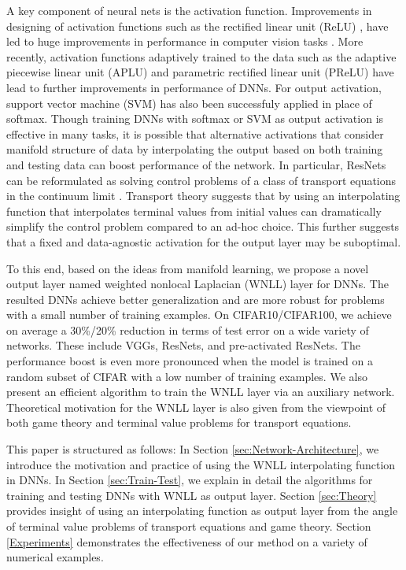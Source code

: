 \documentclass{article}
\begin{document}
A key component of neural nets is the activation function. Improvements in designing of activation functions such as the rectified linear unit (ReLU) \cite{glorot2011deep}, have led to huge improvements in performance in computer vision tasks \cite{nair2010rectified, krizhevsky2012imagenet}. More recently, activation functions adaptively trained to the data such as the adaptive piecewise linear unit (APLU) \cite{agostinelli2014learning} and parametric rectified linear unit (PReLU) \cite{he2015delving} have lead to further improvements in performance of DNNs. For output activation, support vector machine (SVM) has also been successfuly applied in place of softmax\cite{Tang:2013}. Though training DNNs with softmax or SVM as output activation is effective in many tasks, it is possible that alternative activations that consider manifold structure of data by interpolating the output based on both training and testing data can boost performance of the network. In particular, ResNets can be reformulated as solving control problems of a class of transport equations in the continuum limit \cite{ResNet:PDE, chang2017multi}. Transport theory suggests that by using an interpolating function that interpolates terminal values from initial values can dramatically simplify the control problem compared to an ad-hoc choice. This further suggests that a fixed and data-agnostic activation for the output layer may be suboptimal.

To this end, based on the ideas from manifold learning, we propose a novel output layer named weighted nonlocal Laplacian (WNLL) layer for DNNs. The resulted DNNs achieve better generalization and are more robust for problems with a small number of training examples. On CIFAR10/CIFAR100, we achieve on average a 30\%/20\% reduction in terms of test error on a wide variety of networks. These include VGGs, ResNets, and pre-activated ResNets. The performance boost is even more pronounced when the model is trained on a random subset of CIFAR with a low number of training examples. We also present an efficient algorithm to train the WNLL layer via an auxiliary network. Theoretical motivation for the WNLL layer is also given from the viewpoint of both game theory and terminal value problems for transport equations.

This paper is structured as follows: In Section \ref{sec:Network-Architecture}, we introduce the motivation and practice of using the WNLL interpolating function in DNNs. In Section \ref{sec:Train-Test}, we explain in detail the algorithms for training and testing DNNs with WNLL as output layer. Section \ref{sec:Theory} provides insight of using an interpolating function as output layer from the angle of terminal value problems of transport equations and game theory. Section \ref{Experiments} demonstrates the effectiveness of our method on a variety of numerical examples. 
\end{document}
